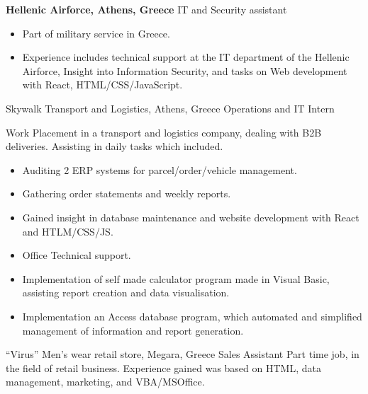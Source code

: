 {\textbf{Hellenic Airforce, Athens, Greece}}
{IT and Security assistant}
{
    \begin{itemize}
        \item Part of military service in Greece.
        \item Experience includes technical support at the IT department of the Hellenic Airforce, Insight into Information Security, and tasks on Web development with React, HTML/CSS/JavaScript.
    \end{itemize}
}

{Skywalk Transport and Logistics, Athens, Greece }
{Operations and IT Intern}
{

    Work Placement in a transport and logistics company, dealing with B2B deliveries. Assisting in daily tasks which included.
    \begin{itemize}
        \item Auditing 2 ERP systems for parcel/order/vehicle management.
        \item Gathering order statements and weekly reports.
        \item Gained insight in database maintenance and website development with React and HTLM/CSS/JS.
        \item Office Technical support.
        \item Implementation of self made calculator program made in Visual Basic, assisting report creation and data visualisation.
        \item Implementation an Access database program, which automated and simplified management of information and report generation.

    \end{itemize}
}

{“Virus” Men’s wear retail store, Megara, Greece}
{Sales Assistant}
{
    Part time job, in the field of retail business. Experience gained was based on HTML, data management, marketing, and VBA/MSOffice.
}
